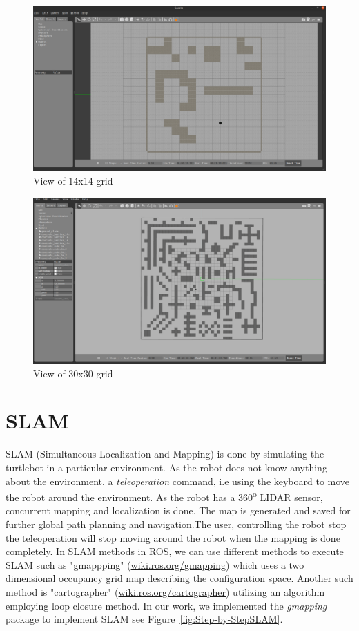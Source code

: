 \begin{figure}[th]
    \centering
    \includegraphics[width=\textwidth]{Figures/base_god_eye_world.png}
    \decoRule
    \caption[]{View of 14x14 grid}
    \label{fig:14x14grid}
\end{figure}

\begin{figure}[th]
    \centering
    \includegraphics[width=\textwidth]{Figures/30_30_god_eye_world.png}
    \decoRule
    \caption[]{View of 30x30 grid}
    \label{fig:30x30grid}
\end{figure}

\section{SLAM}
SLAM (Simultaneous Localization and Mapping) is done by simulating the turtlebot in a particular environment. 
As the robot does not know anything about the environment, a \textit{teleoperation} command, i.e using the keyboard
to move the robot around the environment. As the robot has a 360\textsuperscript{o} LIDAR sensor, concurrent mapping 
and localization is done. The map is generated and saved for further global path planning and navigation.The user, controlling the 
robot stop the teleoperation will stop moving around the robot when the mapping is done completely.
In SLAM methods in ROS, we can use different methods to execute SLAM such as "gmappping" (\url{wiki.ros.org/gmapping}) which uses a two
dimensional occupancy grid map describing the configuration space. Another such method is "cartographer" (\url{wiki.ros.org/cartographer})
utilizing an algorithm employing loop closure method. In our work, we implemented the \textit{gmapping} package to implement SLAM see Figure~\ref{fig:Step-by-StepSLAM}.

